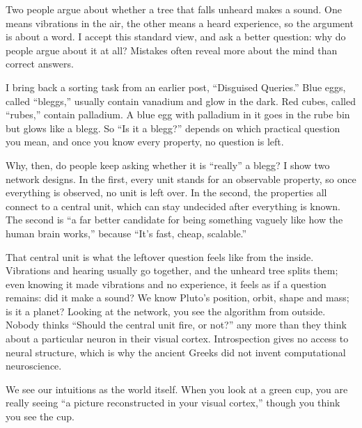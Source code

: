 
Two people argue about whether a tree that falls unheard makes a sound. One means vibrations in the air, the other means a heard experience, so the argument is about a word. I accept this standard view, and ask a better question: why do people argue about it at all? Mistakes often reveal more about the mind than correct answers.

I bring back a sorting task from an earlier post, ``Disguised Queries.'' Blue eggs, called ``bleggs,'' usually contain vanadium and glow in the dark. Red cubes, called ``rubes,'' contain palladium. A blue egg with palladium in it goes in the rube bin but glows like a blegg. So ``Is it a blegg?'' depends on which practical question you mean, and once you know every property, no question is left.

Why, then, do people keep asking whether it is ``really'' a blegg? I show two network designs. In the first, every unit stands for an observable property, so once everything is observed, no unit is left over. In the second, the properties all connect to a central unit, which can stay undecided after everything is known. The second is ``a far better candidate for being something vaguely like how the human brain works,'' because ``It's fast, cheap, scalable.'' 

That central unit is what the leftover question feels like from the inside. Vibrations and hearing usually go together, and the unheard tree splits them; even knowing it made vibrations and no experience, it feels as if a question remains: did it make a sound? We know Pluto's position, orbit, shape and mass; is it a planet? Looking at the network, you see the algorithm from outside. Nobody thinks ``Should the central unit fire, or not?'' any more than they think about a particular neuron in their visual cortex. Introspection gives no access to neural structure, which is why the ancient Greeks did not invent computational neuroscience.

We see our intuitions as the world itself. When you look at a green cup, you are really seeing ``a picture reconstructed in your visual cortex,'' though you think you see the cup. 

